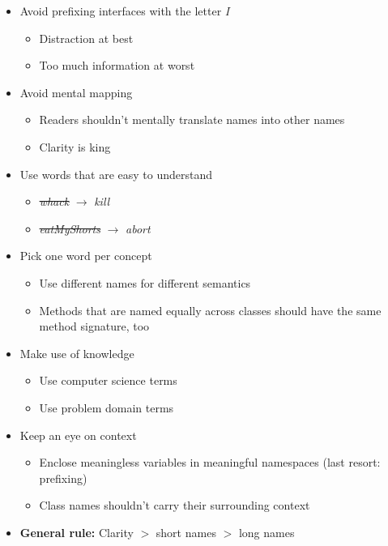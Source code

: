 \begin{itemize}
\begin{itemize}
    \end{itemize}
    \item Avoid prefixing interfaces with the letter \textit{I}
    \begin{itemize}
        \item Distraction at best
        \item Too much information at worst
    \end{itemize}
    \item Avoid mental mapping
    \begin{itemize}
        \item Readers shouldn't mentally translate names into other names
        \item Clarity is king
    \end{itemize}
    \item Use words that are easy to understand
    \begin{itemize}
        \item \st{\textit{whack}} $\rightarrow$ \textit{kill}
        \item \st{\textit{eatMyShorts}} $\rightarrow$ \textit{abort}
    \end{itemize}
    \item Pick one word per concept
    \begin{itemize}
        \item Use different names for different semantics
        \item Methods that are named equally across classes should have the same method signature, too
    \end{itemize}
    \item Make use of knowledge
    \begin{itemize}
        \item Use computer science terms
        \item Use problem domain terms
    \end{itemize}
    \item Keep an eye on context
    \begin{itemize}
        \item Enclose meaningless variables in meaningful namespaces (last resort: prefixing)
        \item Class names shouldn't carry their surrounding context
    \end{itemize}
    \item \textbf{General rule:} Clarity $>$ short names $>$ long names
\end{itemize}